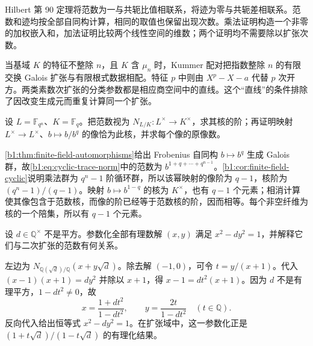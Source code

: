 




\begin{chaptersummary}
	Hilbert 第 90 定理将范数为一与共轭比值相联系，将迹为零与共轭差相联系。范数和迹均按全部自同构计算，相同的取值也保留出现次数。乘法证明构造一个非零的加权嵌入和，加法证明比较两个线性空间的维数；两个证明均不需要除以扩张次数。

	\ProseParagraphBreak
	当基域 \(K\) 的特征不整除 \(n\)，且 \(K\) 含 \(\mu_n\) 时，Kummer 配对把指数整除 \(n\) 的有限交换 Galois 扩张与有限根式数据相配。特征 \(p\) 中则由 \(X^p-X-a\) 代替 \(p\) 次开方。两类素数次扩张的分类参数都是相应商空间中的直线。这个“直线”的条件排除了因改变生成元而重复计算同一个扩张。
\end{chaptersummary}

\BookExercises

\begin{exercise}\label{b1:ex:20-1}
	设 \(L=\mathbb F_{q^n}\)、\(K=\mathbb F_q\)。把范数视为 \(N_{L/K}:L^\times\rightarrow K^\times\)，求其核的阶；再证明映射 \(L^\times\rightarrow L^\times\)、\(b\mapsto b/b^q\) 的像恰为此核，并求每个像的原像数。
\end{exercise}
\begin{solution}
	\cref{b1:thm:finite-field-automorphisms}给出 Frobenius 自同构 \(b\mapsto b^q\) 生成 Galois 群，故\eqref{b1:eq:cyclic-trace-norm}中的范数为 \(b^{1+q+\cdots+q^{n-1}}\)。\cref{b1:cor:finite-field-cyclic}说明乘法群为 \(q^n-1\) 阶循环群，所以该幂映射的像阶为 \(q-1\)，核阶为 \((q^n-1)/(q-1)\)。映射 \(b\mapsto b^{1-q}\) 的核为 \(K^\times\)，也有 \(q-1\) 个元素；相消计算使其像包含于范数核，而像的阶已经等于范数核的阶，因而相等。每个非空纤维为核的一个陪集，所以有 \(q-1\) 个元素。
\end{solution}

\begin{exercise}\label{b1:ex:20-2}
	设 \(d\in\mathbb Q^\times\) 不是平方。参数化全部有理数解 \((x,y)\) 满足 \(x^2-dy^2=1\)，并解释它们与二次扩张的范数有何关系。
\end{exercise}
\begin{solution}
	左边为 \(N_{\mathbb Q(\sqrt d)/\mathbb Q}(x+y\sqrt d)\)。除去解 \((-1,0)\)，可令 \(t=y/(x+1)\)。代入 \((x-1)(x+1)=dy^2\) 并除以 \(x+1\)，得 \(x-1=dt^2(x+1)\)。因为 \(d\) 不是有理平方，\(1-dt^2\neq0\)，故
	\[
		x=\frac{1+dt^2}{1-dt^2},\qquad y=\frac{2t}{1-dt^2}\quad(t\in\mathbb Q).
	\]
	反向代入给出恒等式 \(x^2-dy^2=1\)。在扩张域中，这一参数化正是 \((1+t\sqrt d)/(1-t\sqrt d)\) 的有理化结果。
\end{solution}

